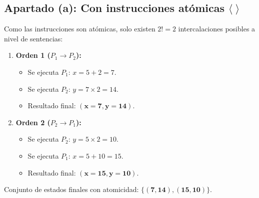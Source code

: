 \begin{solucion}
\subsection*{Apartado (a): Con instrucciones atómicas $\langle \; \rangle$}
Como las instrucciones son atómicas, solo existen $2! = 2$ intercalaciones posibles a nivel de sentencias:

\begin{enumerate}[leftmargin=*]
    \item \textbf{Orden 1 ($P_1 \to P_2$):}
    \begin{itemize}
        \item Se ejecuta $P_1$: $x = 5 + 2 = 7$.
        \item Se ejecuta $P_2$: $y = 7 \times 2 = 14$.
        \item Resultado final: $\mathbf{(x = 7, y = 14)}$.
    \end{itemize}
    \item \textbf{Orden 2 ($P_2 \to P_1$):}
    \begin{itemize}
        \item Se ejecuta $P_2$: $y = 5 \times 2 = 10$.
        \item Se ejecuta $P_1$: $x = 5 + 10 = 15$.
        \item Resultado final: $\mathbf{(x = 15, y = 10)}$.
    \end{itemize}
\end{enumerate}
Conjunto de estados finales con atomicidad: $\mathbf{\{(7, 14), (15, 10)\}}$.


\end{solucion}
